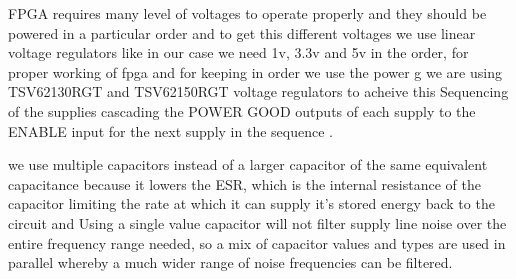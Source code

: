 FPGA requires many level of voltages to operate properly and they should be powered in a particular order and to get this different voltages we use linear voltage regulators like in our case we need 1v, 3.3v and 5v in the order, for proper working of fpga and for keeping in order we use the power g we are using TSV62130RGT and TSV62150RGT voltage regulators to acheive this Sequencing of the supplies cascading the POWER GOOD outputs of each supply to the ENABLE input for the next supply in the sequence .

we use multiple capacitors instead of a larger capacitor of the same equivalent capacitance because it lowers the ESR, which is the internal resistance of the capacitor limiting the rate at which it can supply it's stored energy back to the circuit and Using a single value capacitor will not filter supply line noise over the entire frequency range needed, so a mix of capacitor values and types are used in parallel whereby a much wider range of noise frequencies can be filtered.

